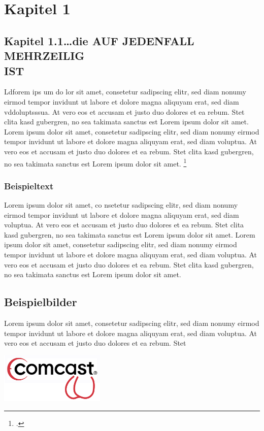 \section{Kapitel 1}

\subsection{Kapitel 1.1\ldots die AUF JEDENFALL MEHRZEILIG\\IST}

Ldforem ips um do lor sit amet, consetetur sadipscing elitr, \label{Referenz}
sed diam  nonumy eirmod tempor invidunt ut labore et dolore magna aliquyam erat,
sed diam vddoluptsssua. At vero eos et accusam et justo duo dolores et ea rebum.
Stet clita kasd gubergren, no sea takimata sanctus est Lorem ipsum dolor sit amet. Lorem ipsum dolor sit amet, consetetur sadipscing elitr, sed diam nonumy eirmod tempor invidunt ut labore et dolore magna aliquyam erat, sed diam voluptua. At vero eos et accusam et justo duo dolores et ea rebum. Stet clita kasd gubergren, no sea takimata sanctus est Lorem ipsum dolor sit amet.
\footcite[Vgl.][Experto.de, Artikel über das und jenes]{praxishandbuch:bpmn2}
\subsubsection{Beispieltext}
Lorem ipsum dolor sit amet, co nsetetur sadipscing elitr, sed diam
nonumy eirmod tempor invidunt ut labore et dolore magna aliquyam erat, sed diam voluptua. At vero eos et accusam et justo duo dolores et ea rebum. Stet clita kasd gubergren, no sea takimata sanctus est Lorem ipsum dolor sit amet. Lorem ipsum dolor sit amet, consetetur sadipscing elitr, sed diam nonumy eirmod tempor invidunt ut labore et dolore magna aliquyam erat, sed diam voluptua. At vero eos et accusam et justo duo dolores et ea rebum. Stet clita kasd gubergren, no sea takimata sanctus est Lorem ipsum dolor sit amet.

\clearpage

\subsection{Beispielbilder}
Lorem ipsum dolor sit amet, consetetur sadipscing elitr, sed diam nonumy eirmod tempor invidunt ut labore et dolore magna aliquyam erat, sed diam voluptua. At vero eos et accusam et justo duo dolores et ea rebum. Stet

\begin{center}
	\includegraphics[width=5cm]{bilder/company_logo.png}
\end{center}

